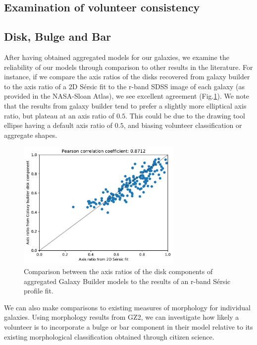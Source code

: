 \documentclass[../main.tex]{subfiles}
\begin{document}
\subsection{Examination of volunteer consistency}


\subsection{Disk, Bulge and Bar}

After having obtained aggregated models for our galaxies, we examine the reliability of our models through comparison to other results in the literature. For instance, if we compare the axis ratios of the disks recovered from galaxy builder to the axis ratio of a 2D S\'ersic fit to the r-band SDSS image of each galaxy (as provided in the NASA-Sloan Atlas), we see excellent agreement (Fig.\ref{fig:ax_ratio_comparison}). We note that the results from galaxy builder tend to prefer a slightly more elliptical axis ratio, but plateau at an axis ratio of $0.5$. This could be due to the drawing tool ellipse having a default axis ratio of $0.5$, and biasing volunteer classification or aggregate shapes.

\begin{figure}
  \includegraphics[width=8cm]{images__results/GZBvsNSA_ax-ratio_SERSIC_BA.pdf}
  \caption{Comparison between the axis ratios of the disk components of aggregated Galaxy Builder models to the results of an r-band S\'ersic profile fit.}
  \label{fig:ax_ratio_comparison}
\end{figure}

We can also make comparisons to existing measures of morphology for individual galaxies. Using morphology results from GZ2, we can investigate how likely a volunteer is to incorporate a bulge or bar component in their model relative to its existing morphological classification obtained through citizen science.
\end{document}
